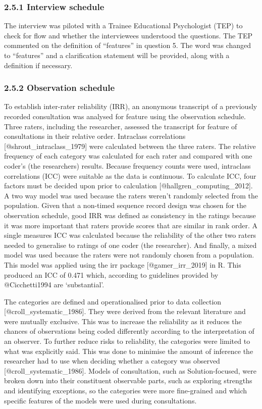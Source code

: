\documentclass[
]{article}
\begin{document}
\hypertarget{interview-schedule}{%
\subsubsection{2.5.1 Interview schedule}\label{interview-schedule}}

The interview was piloted with a Trainee Educational Psychologist (TEP)
to check for flow and whether the interviewees understood the questions.
The TEP commented on the definition of ``features'' in question 5. The
word was changed to ``features'' and a clarification statement will be
provided, along with a definition if necessary.

\hypertarget{observation-schedule}{%
\subsubsection{2.5.2 Observation schedule}\label{observation-schedule}}

To establish inter-rater reliability (IRR), an anonymous transcript of a
previously recorded consultation was analysed for feature using the
observation schedule. Three raters, including the researcher, assessed
the transcript for feature of consultations in their relative order.
Intraclass correlations {[}@shrout\_intraclass\_1979{]} were calculated
between the three raters. The relative frequency of each category was
calculated for each rater and compared with one coder's (the
researchers) results. Because frequency counts were used, intraclass
correlations (ICC) were suitable as the data is continuous. To calculate
ICC, four factors must be decided upon prior to calculation
{[}@hallgren\_computing\_2012{]}. A two way model was used because the
raters weren't randomly selected from the population. Given that a
non-timed sequence record design was chosen for the observation
schedule, good IRR was defined as consistency in the ratings because it
was more important that raters provide scores that are similar in rank
order. A single measures ICC was calculated because the reliability of
the other two raters needed to generalise to ratings of one coder (the
researcher). And finally, a mixed model was used because the raters were
not randomly chosen from a population. This model was applied using the
irr package {[}@gamer\_irr\_2019{]} in R. This produced an ICC of 0.471
which, according to guidelines provided by @Cicchetti1994 are
`substantial'.

The categories are defined and operationalised prior to data collection
{[}@croll\_systematic\_1986{]}. They were derived from the relevant
literature and were mutually exclusive. This was to increase the
reliability as it reduces the chances of observations being coded
differently according to the interpretation of an observer. To further
reduce risks to reliability, the categories were limited to what was
explicitly said. This was done to minimise the amount of inference the
researcher had to use when deciding whether a category was observed
{[}@croll\_systematic\_1986{]}. Models of consultation, such as
Solution-focused, were broken down into their constituent observable
parts, such as exploring strengths and identifying exceptions, so the
categories were more fine-grained and which specific features of the
models were used during consultations.
\end{document}
